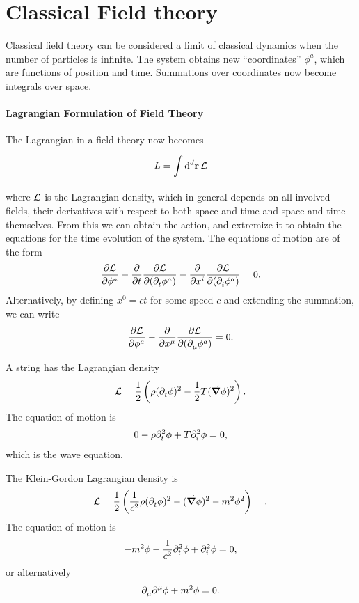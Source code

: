 \section{Classical Field theory}

Classical field theory can be considered a limit of classical dynamics when the number of particles is infinite. The system obtains new ``coordinates'' $\phi^{a}$, which are functions of position and time. Summations over coordinates now become integrals over space.

\paragraph{Lagrangian Formulation of Field Theory}
The Lagrangian in a field theory now becomes
\begin{align*}
	L = \integ[d]{}{}{\vb{r}}{\lag}
\end{align*}
where $\lag$ is the Lagrangian density, which in general depends on all involved fields, their derivatives with respect to both space and time and space and time themselves. From this we can obtain the action, and extremize it to obtain the equations for the time evolution of the system. The equations of motion are of the form
\begin{align*}
	\pdv{\lag}{\phi^{a}} - \pdv{t}\pdv{\lag}{(\del{t}{\phi^{a}})} - \pdv{x^{i}}\pdv{\lag}{(\del{i}{\phi^{a}})} = 0.
\end{align*}
Alternatively, by defining $x^{0} = ct$ for some speed $c$ and extending the summation, we can write
\begin{align*}
	\pdv{\lag}{\phi^{a}} - \pdv{x^{\mu}}\pdv{\lag}{(\del{\mu}{\phi^{a}})} = 0.
\end{align*}

A string has the Lagrangian density
\begin{align*}
	\lag = \frac{1}{2}\left(\rho(\del{t}{\phi})^{2} - \frac{1}{2}T(\grad{\phi})^{2}\right).
\end{align*}
The equation of motion is
\begin{align*}
	0 - \rho\del[2]{t}{\phi} + T\del[2]{i}{\phi} = 0,
\end{align*}
which is the wave equation.

The Klein-Gordon Lagrangian density is
\begin{align*}
	\lag = \frac{1}{2}\left(\frac{1}{c^{2}}\rho(\del{t}{\phi})^{2} - (\grad{\phi})^{2} - m^{2}\phi^{2}\right) = .
\end{align*}
The equation of motion is
\begin{align*}
	-m^{2}\phi - \frac{1}{c^{2}}\del[2]{t}{\phi} + \del[2]{i}{\phi} = 0,
\end{align*}
or alternatively
\begin{align*}
	\del{\mu}{\del[\mu]{}{\phi}} + m^{2}\phi = 0.
\end{align*}

